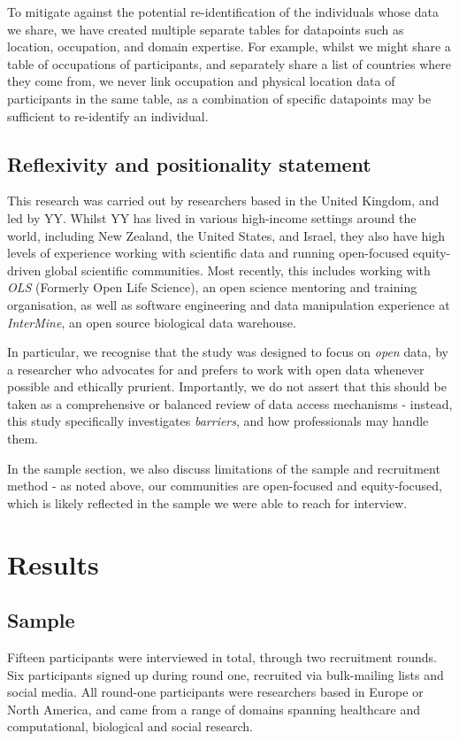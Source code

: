 \documentclass{CUP-JNL-DAP}%
\begin{document}
To mitigate against the potential re-identification of the individuals whose data we share, we have created multiple separate tables for datapoints such as location, occupation, and domain expertise. For example, whilst we might share a table of occupations of participants, and separately share a list of countries where they come from, we never link occupation and physical location data of participants in the same table, as a combination of specific datapoints may be sufficient to re-identify an individual.

\subsection{Reflexivity and positionality statement} 
This research was carried out by researchers based in the United Kingdom, and led by YY. Whilst YY has lived in various high-income settings around the world, including New Zealand, the United States, and Israel, they also have high levels of experience working with scientific data and running open-focused equity-driven global scientific communities. Most recently, this includes working with \textit{OLS} (Formerly Open Life Science), an open science mentoring and training organisation, as well as software engineering and data manipulation experience at \textit{InterMine}, an open source biological data warehouse. 

In particular, we recognise that the study was designed to focus on \textit{open} data, by a researcher who advocates for and prefers to work with open data whenever possible and ethically prurient. Importantly, we do not assert that this should be taken as a comprehensive or balanced review of data access mechanisms - instead, this study specifically investigates \textit{barriers}, and how professionals may handle them. 

In the sample section, we also discuss limitations of the sample and recruitment method - as noted above, our communities are open-focused and equity-focused, which is likely reflected in the sample we were able to reach for interview. 

\section{Results}
\subsection{Sample}
Fifteen participants were interviewed in total, through two recruitment rounds. Six participants signed up during round one, recruited via bulk-mailing lists and social media. All round-one participants were researchers based in Europe or North America, and came from a range of domains spanning healthcare and computational, biological and social research.
\end{document}

